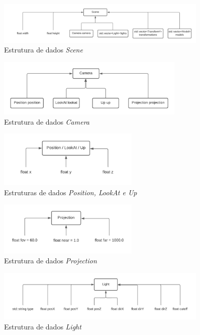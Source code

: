 \documentclass[11pt,a4paper]{report}%
\begin{document}
\begin{figure}[H]
       \centering
       \includegraphics[width=0.9\textwidth]{images/data_structure_scene.png}
       \caption{Estrutura de dados \emph{Scene}} \label{fig:scene} 
\end{figure}
\begin{figure}[H]
	\centering
	\includegraphics[width=0.8\textwidth]{images/data_structure_camera.png}
	\caption{Estrutura de dados \emph{Camera}} \label{fig:camera}
\end{figure}
\begin{figure}[H]
	\centering
	\includegraphics[width=0.6\textwidth]{images/struct_position.png}
	\caption{Estruturas de dados \emph{Position, LookAt e Up}} \label{fig:position}
\end{figure}
\begin{figure}[H]
	\centering
	\includegraphics[width=0.6\textwidth]{images/struct_projection.png}
	\caption{Estrutura de dados \emph{Projection}} \label{fig:projection}
\end{figure}
\begin{figure}[H]
	\centering
	\includegraphics[width=0.9\textwidth]{images/struct_light.png}
	\caption{Estrutura de dados \emph{Light}} \label{fig:light}
\end{figure}
\end{document}

